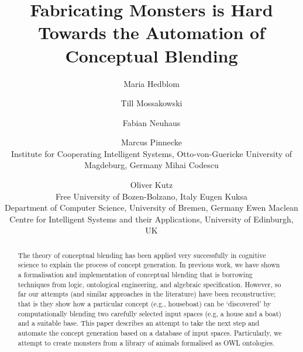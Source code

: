\documentclass[letterpaper]{article}
\title{Fabricating Monsters is Hard\\ Towards the Automation of Conceptual Blending}
\author{
Maria Hedblom \and Till Mossakowski \and Fabian Neuhaus \and Marcus Pinnecke\\
Institute for Cooperating Intelligent Systems,  Otto-von-Guericke University of Magdeburg, Germany
\AND
Mihai Codescu \and Oliver Kutz \\
Free University of Bozen-Bolzano, Italy
\AND
Eugen Kuksa \\
Department of Computer Science, University of Bremen, Germany
\AND
Ewen Maclean\\
Centre for Intelligent Systems and their Applications, University of Edinburgh, UK}
\begin{document}
\maketitle



\begin{abstract}
The theory of conceptual blending has been applied very successfully  in cognitive
 science to explain the process of concept generation. In previous work, we have shown
  a formalisation and implementation of conceptual blending that is borrowing techniques 
  from logic, ontological engineering, and algebraic specification. However, so far 
  our attempts (and similar approaches in the literature) have been reconstructive;
   that is they show how a particular concept (e.g., houseboat)  can be `discovered' 
   by computationally blending two carefully selected input spaces (e.g, a house and a boat) 
   and a suitable base. This paper describes an attempt to take the next step and automate the
    concept generation based on a database of input spaces. Particularly, we attempt to create monsters from a library of animals formalised as OWL ontologies.
 

\end{abstract}
\end{document}
